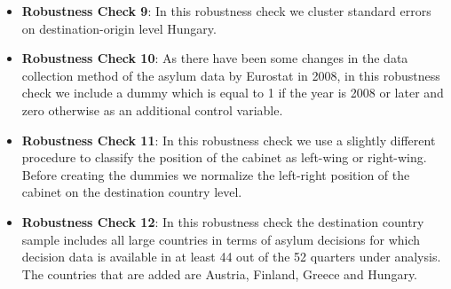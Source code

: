\documentclass[11pt,a4paper]{scrartcl}
\begin{document}
\begin{itemize}
	\item \textbf{Robustness Check 9}: In this robustness check we cluster standard errors on destination-origin level Hungary.  
	
	\item \textbf{Robustness Check 10}: As there have been some changes in the data collection method of the asylum data by Eurostat in 2008, in this robustness check we include a dummy which is equal to 1 if the year is 2008 or later and zero otherwise as an additional control variable. 

	\item \textbf{Robustness Check 11}: In this robustness check we use a slightly different procedure to classify the position of the cabinet as left-wing or right-wing. Before creating the dummies we normalize the left-right position of the cabinet on the destination country level.

	\item \textbf{Robustness Check 12}: In this robustness check the destination country sample includes all large countries in terms of asylum decisions for which decision data is available in at least 44 out of the 52 quarters under analysis. The countries that are added are Austria, Finland, Greece and Hungary. 
	 
\end{itemize}	
	

%
%
%
%
%
\end{document}

